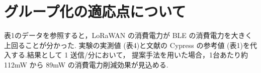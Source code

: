 \section{グループ化の適応点について}
表1のデータを参照すると，LoRaWAN の消費電力が BLE の消費電力を大きく 上回ることが分かった.
実験の実測値 (表4)と文献の Cypress の参考値 (表1)を代入する.結果として 1 送信/分において， 提案手法を用いた場合，1台あたり約 112mW から 89mW の消費電力削減効果が見込める.